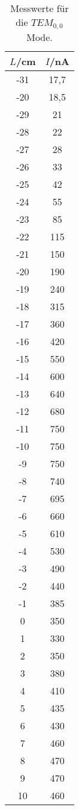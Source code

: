 \begin{table}[htp]
	\begin{center}
    \caption{Messwerte für die $TEM_{0,0}$ Mode.}
    \label{tab:tem01a}
		\begin{tabular}{cc}
		\toprule
			{$L$/cm} & {$I$/nA}\\
			\midrule
			-31 & 17,7\\
			-20 & 18,5\\
			-29 & 21\\
			-28 & 22\\
			-27 & 28\\
			-26 & 33\\
			-25 & 42\\
			-24 & 55\\
			-23 & 85\\
			-22 & 115\\
			-21 & 150\\
			-20 & 190\\
			-19 & 240\\
			-18 & 315\\
			-17 & 360\\
			-16 & 420\\
			-15 & 550\\
			-14 & 600\\
			-13 & 640\\
			-12 & 680\\
			-11 & 750\\
			-10 & 750\\
			-9 & 750\\
			-8 & 740\\
			-7 & 695\\
			-6 & 660\\
			-5 & 610\\
			-4 & 530\\
			-3 & 490\\
			-2 & 440\\
			-1 & 385\\
			0 & 350\\
			1 & 330\\
			2 & 350\\
			3 & 380\\
			4 & 410\\
			5 & 435\\
			6 & 430\\
			7 & 460\\
			8 & 470\\
			9 & 470\\
			10 & 460\\
		\bottomrule
		\end{tabular}
	\end{center}
\end{table}

